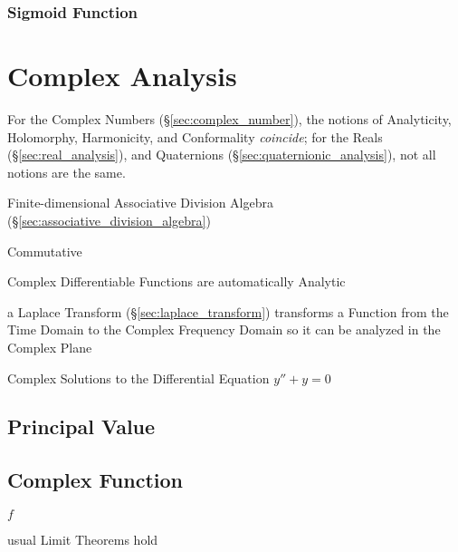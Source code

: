 
\subsubsection{Sigmoid Function}\label{sec:sigmoid_function}



\section{Complex Analysis}\label{sec:complex_analysis}

For the Complex Numbers (\S\ref{sec:complex_number}), the notions of
Analyticity, Holomorphy, Harmonicity, and Conformality \emph{coincide}; for the
Reals (\S\ref{sec:real_analysis}), and Quaternions
(\S\ref{sec:quaternionic_analysis}), not all notions are the same.

Finite-dimensional Associative Division Algebra
(\S\ref{sec:associative_division_algebra})

Commutative

Complex Differentiable Functions are automatically Analytic %

a Laplace Transform (\S\ref{sec:laplace_transform}) transforms a Function from
the Time Domain to the Complex Frequency Domain so it can be analyzed in the
Complex Plane

Complex Solutions to the Differential Equation $y'' + y = 0$



\subsection{Principal Value}\label{sec:principal_value}

\subsection{Complex Function}\label{sec:complex_function}

$f$

usual Limit Theorems hold

